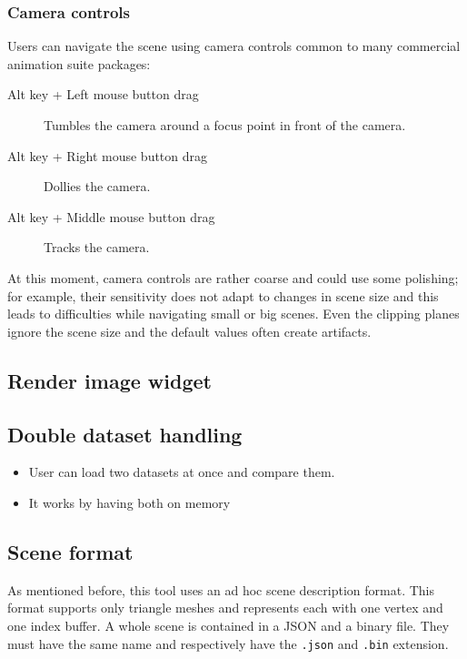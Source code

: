 \subsubsection{Camera controls}
Users can navigate the scene using camera controls common to many commercial animation suite packages:
\begin{description}
	\item[Alt key + Left mouse button drag] Tumbles the camera around a focus point in front of the camera.
	\item[Alt key + Right mouse button drag] Dollies the camera.
	\item[Alt key + Middle mouse button drag] Tracks the camera. 
\end{description}
At this moment, camera controls are rather coarse and could use some polishing; for example, their sensitivity does not adapt to changes in scene size and this leads to difficulties while navigating small or big scenes. Even the clipping planes ignore the scene size and the default values often create artifacts.



\subsection{Render image widget}


\subsection{Double dataset handling}
\begin{itemize}
	\item User can load two datasets at once and compare them.
	\item It works by having both on memory
\end{itemize}


\subsection{Scene format}
\label{scene_format}

As mentioned before, this tool uses an ad hoc scene description format. This format supports only triangle meshes and represents each with one vertex and one index buffer. A whole scene is contained in a JSON \cite{rfc8259} and a binary file. They must have the same name and respectively have the \texttt{.json} and \texttt{.bin} extension. 

